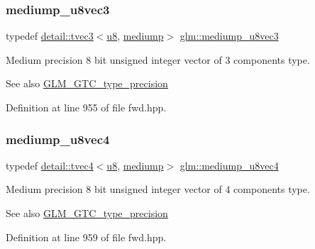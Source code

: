 \subsubsection{\texorpdfstring{mediump\+\_\+u8vec3}{mediump\_u8vec3}}
{\footnotesize\ttfamily typedef \hyperlink{structglm_1_1detail_1_1tvec3}{detail\+::tvec3}$<$\hyperlink{group__gtc__type__precision_ga5e3dc67373d5068997d2d9f41c9024d2}{u8}, \hyperlink{namespaceglm_a0f04f086094c747d227af4425893f545a6416f3ea0c9025fb21ed50c4d6620482}{mediump}$>$ \hyperlink{group__gtc__type__precision_ga58f79eee840b2838443292c50ddb2919}{glm\+::mediump\+\_\+u8vec3}}

Medium precision 8 bit unsigned integer vector of 3 components type. \begin{DoxySeeAlso}{See also}
\hyperlink{group__gtc__type__precision}{G\+L\+M\+\_\+\+G\+T\+C\+\_\+type\+\_\+precision} 
\end{DoxySeeAlso}


Definition at line 955 of file fwd.\+hpp.

\mbox{\label{group__gtc__type__precision_ga407b5aa9a3fd6d344b70fa6ce2ce92d4}} 
\subsubsection{\texorpdfstring{mediump\+\_\+u8vec4}{mediump\_u8vec4}}
{\footnotesize\ttfamily typedef \hyperlink{structglm_1_1detail_1_1tvec4}{detail\+::tvec4}$<$\hyperlink{group__gtc__type__precision_ga5e3dc67373d5068997d2d9f41c9024d2}{u8}, \hyperlink{namespaceglm_a0f04f086094c747d227af4425893f545a6416f3ea0c9025fb21ed50c4d6620482}{mediump}$>$ \hyperlink{group__gtc__type__precision_ga407b5aa9a3fd6d344b70fa6ce2ce92d4}{glm\+::mediump\+\_\+u8vec4}}

Medium precision 8 bit unsigned integer vector of 4 components type. \begin{DoxySeeAlso}{See also}
\hyperlink{group__gtc__type__precision}{G\+L\+M\+\_\+\+G\+T\+C\+\_\+type\+\_\+precision} 
\end{DoxySeeAlso}


Definition at line 959 of file fwd.\+hpp.

\mbox{\label{group__gtc__type__precision_ga2cef3a0d7b0fce75c9885f64656d8933}} 
